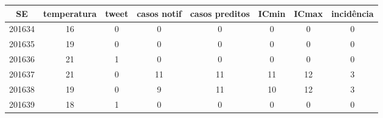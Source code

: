 \begin{tabular}{c|ccccccc}
  \hline
SE & temperatura & tweet & casos notif & casos preditos & ICmin & ICmax & incidência \\ 
  \hline
201634 & 16 & 0 & 0 & 0 & 0 & 0 & 0 \\ 
  201635 & 19 & 0 & 0 & 0 & 0 & 0 & 0 \\ 
  201636 & 21 & 1 & 0 & 0 & 0 & 0 & 0 \\ 
  201637 & 21 & 0 & 11 & 11 & 11 & 12 & 3 \\ 
  201638 & 19 & 0 & 9 & 11 & 10 & 12 & 3 \\ 
  201639 & 18 & 1 & 0 & 0 & 0 & 0 & 0 \\ 
   \hline
\end{tabular}

